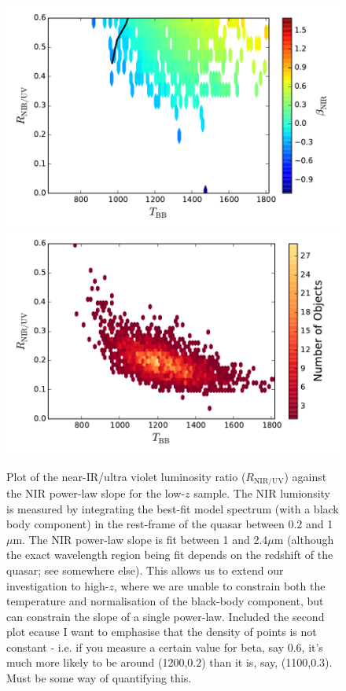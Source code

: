 \begin{figure}
\centering
  \includegraphics[width=\columnwidth]{figures/chapter06/ratio_tbb_v3}
  \includegraphics[width=\columnwidth]{figures/chapter06/ratio_tbb_density_v3}
\caption{ Plot of the near-IR/ultra violet luminosity ratio ($R_{\mathrm{NIR}/\mathrm{UV}}$) against the NIR power-law slope for the low-$z$ sample. The NIR lumionsity is measured by integrating the best-fit model spectrum (with a black body component) in the rest-frame of the quasar between 0.2 and 1 $\mu$m. The NIR power-law slope is fit between 1 and 2.4$\mu$m (although the exact wavelength region being fit depends on the redshift of the quasar; see somewhere else). This allows us to extend our investigation to high-$z$, where we are unable to constrain both the temperature and normalisation of the black-body component, but can constrain the slope of a single power-law. Included the second plot ecause I want to emphasise that the density of points is not constant - i.e. if you measure a certain value for beta, say 0.6, it's much more likely to be around (1200,0.2) than it is, say, (1100,0.3). Must be some way of quantifying this.}
  \label{fig:fig}
\end{figure}


